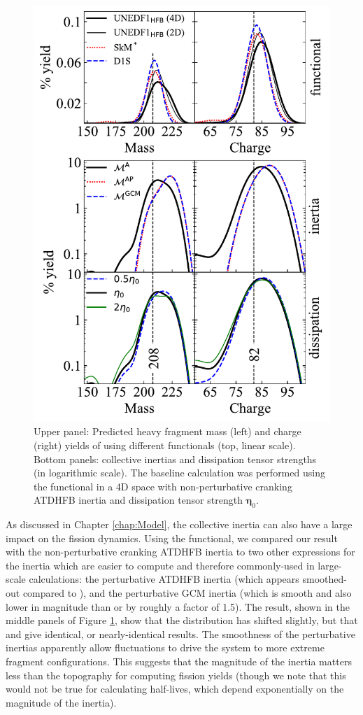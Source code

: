 \begin{figure}
	\centering
	\includegraphics[width=0.7\linewidth]{TeX_files/294Og_compare_all}
	\caption[$^{294}$Og heavy fragment masses and charges.]{Upper panel: Predicted heavy fragment mass (left) and charge (right) yields of \Og{} using different functionals (top, linear scale). Bottom panels: collective inertias and dissipation tensor strengths (in logarithmic scale). The baseline calculation was performed using the \hfb{} functional in a 4D space with non-perturbative cranking ATDHFB inertia and dissipation tensor strength $\mathbf{\eta}_0$.}
	\label{fig:294ogcompareall}
\end{figure}

As discussed in Chapter \ref{chap:Model}, the collective inertia can also have a large impact on the fission dynamics. Using the {\hfb} functional, we compared our result with the non-perturbative cranking ATDHFB inertia {\MATDHF} to two other expressions for the inertia which are easier to compute and therefore commonly-used in large-scale calculations: the perturbative ATDHFB inertia {\MATDHFp} (which appears smoothed-out compared to {\MATDHF}), and the perturbative GCM inertia {\MGCMp} (which is smooth and also lower in magnitude than {\MATDHF} or {\MATDHFp} by roughly a factor of 1.5). The result, shown in the middle panels of Figure \ref{fig:294ogcompareall}, show that the distribution has shifted slightly, but that {\MATDHFp} and {\MGCMp} give identical, or nearly-identical results. The smoothness of the perturbative inertias apparently allow fluctuations to drive the system to more extreme fragment configurations. This suggests that the magnitude of the inertia matters less than the topography for computing fission yields (though we note that this would not be true for calculating half-lives, which depend exponentially on the magnitude of the inertia).

